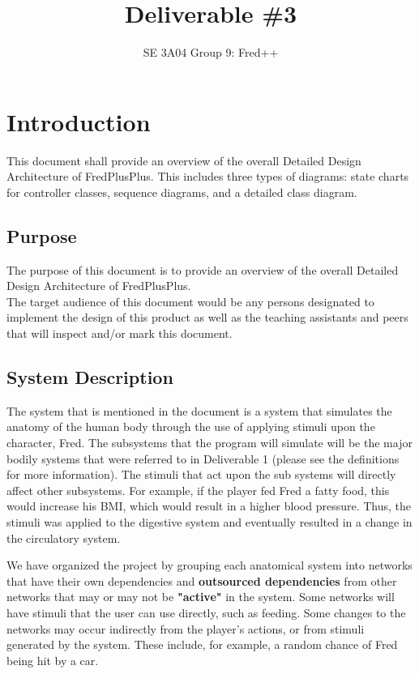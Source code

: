 \documentclass[]{article}
\title{Deliverable \#3}
\author{SE 3A04 Group 9: Fred++}
\date{}
\begin{document}
\maketitle	

\section{Introduction}
\label{sec:introduction}


This document shall provide an overview of the overall Detailed Design Architecture of FredPlusPlus. This includes three types of diagrams: state charts for controller classes, sequence diagrams, and a detailed class diagram.



\subsection{Purpose}
\label{sub:purpose}

The purpose of this document is to provide an overview of the overall Detailed Design Architecture of FredPlusPlus.\\
The target audience of this document would be any persons designated to implement the design of this product as well as the teaching assistants and peers that will
inspect and/or mark this document.

\subsection{System Description}
\label{sub:system_description}
The system that is mentioned in the document is a system that simulates the anatomy of the human body through the use of applying stimuli upon the character, Fred. The subsystems that the program will simulate will be the major bodily systems that were referred to in Deliverable 1 (please see the definitions for more information). The stimuli that act upon the sub systems will directly affect other subsystems. For example, if the player fed Fred a fatty food, this would increase his BMI, which would result in a higher blood pressure. Thus, the stimuli was applied to the digestive system and eventually resulted in a change in the circulatory system.
	
We have organized the project by grouping each anatomical system into networks that have their own dependencies and \textbf{outsourced dependencies} from other networks that may or may not be \textbf{"active"} in the system. Some networks will have stimuli that
the user can use directly, such as feeding. Some changes to the networks may occur indirectly from the player's actions, or from stimuli generated by the system. These include, for example, a random chance of Fred being hit by a car.
\end{document}
